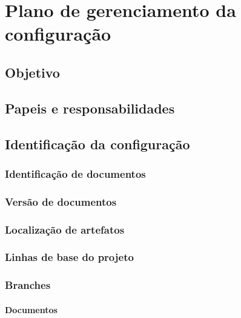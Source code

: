 \chapter{Plano de gerenciamento da configuração} %
\label{ch:configuration-management-plan}


\section{Objetivo}

\section{Papeis e responsabilidades}

\section{Identificação da configuração}

\subsection{Identificação de documentos}

\subsection{Versão de documentos}

\subsection{Localização de artefatos}

\subsection{Linhas de base do projeto}

\subsection{Branches}

\subsubsection{Documentos}

